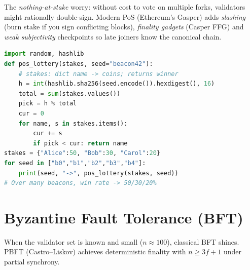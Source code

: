 The \emph{nothing-at-stake} worry: without cost to vote on multiple forks, validators might rationally double-sign. Modern PoS (Ethereum's Gasper) adds \emph{slashing} (burn stake if you sign conflicting blocks), \emph{finality gadgets} (Casper FFG) and \emph{weak subjectivity} checkpoints so late joiners know the canonical chain.

\begin{lstlisting}[language=Python]
import random, hashlib
def pos_lottery(stakes, seed="beacon42"):
    # stakes: dict name -> coins; returns winner
    h = int(hashlib.sha256(seed.encode()).hexdigest(), 16)
    total = sum(stakes.values())
    pick = h % total
    cur = 0
    for name, s in stakes.items():
        cur += s
        if pick < cur: return name
stakes = {"Alice":50, "Bob":30, "Carol":20}
for seed in ["b0","b1","b2","b3","b4"]:
    print(seed, "->", pos_lottery(stakes, seed))
# Over many beacons, win rate -> 50/30/20%
\end{lstlisting}

\section{Byzantine Fault Tolerance (BFT)}\label{sec:bft}
When the validator set is known and small ($n\approx100$), classical BFT shines. PBFT (Castro--Liskov) achieves deterministic finality with $n\ge 3f+1$ under partial synchrony.

